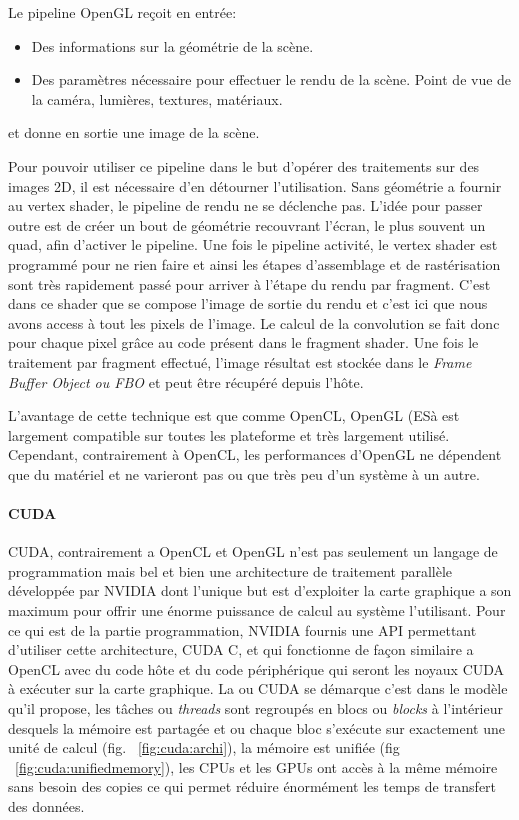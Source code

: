 
Le pipeline OpenGL reçoit en entrée:
\begin{itemize}
\item Des informations sur la géométrie de la scène.
\item Des paramètres nécessaire pour effectuer le rendu de la scène. Point de vue de la caméra, lumières, textures, matériaux.
\end{itemize}
et donne en sortie une image de la scène.

Pour pouvoir utiliser ce pipeline dans le but d'opérer des traitements sur des images 2D, il est nécessaire d'en détourner l'utilisation. Sans géométrie a fournir au vertex shader, le pipeline de rendu ne se déclenche pas. L'idée pour passer outre est de créer un bout de géométrie recouvrant l'écran, le plus souvent un quad, afin d'activer le pipeline. Une fois le pipeline activité, le vertex shader est programmé pour ne rien faire  et ainsi les étapes d'assemblage et de rastérisation sont très rapidement passé pour arriver à l'étape du rendu par fragment. C'est dans ce shader que se compose l'image de sortie du rendu et c'est ici que nous avons access à tout les pixels de l'image. Le calcul de la convolution se fait donc pour chaque pixel grâce au code présent dans le fragment shader. Une fois le traitement par fragment effectué, l'image résultat est stockée dans le \emph{Frame Buffer Object ou FBO} et peut être récupéré depuis l'hôte.

L'avantage de cette technique est que comme OpenCL, OpenGL (ESà est largement compatible sur toutes les plateforme et très largement utilisé. Cependant, contrairement à OpenCL, les performances d'OpenGL ne dépendent que du matériel et ne varieront pas ou que très peu d'un système à un autre.

\paragraph{CUDA} CUDA, contrairement a OpenCL et OpenGL n'est pas seulement un langage de programmation mais bel et bien une architecture de traitement parallèle développée par NVIDIA dont l'unique but est d'exploiter la carte graphique a son maximum pour offrir une énorme puissance de calcul au système l'utilisant. Pour ce qui est de la partie programmation, NVIDIA fournis une API permettant d'utiliser cette architecture, CUDA C, et qui fonctionne de façon similaire a OpenCL avec du code hôte et du code périphérique qui seront les noyaux CUDA à exécuter sur la carte graphique. La ou CUDA se démarque c'est dans le modèle qu'il propose, les tâches ou \emph{threads} sont regroupés en blocs ou \emph{blocks} à l'intérieur desquels la mémoire est partagée et ou chaque bloc s'exécute sur exactement une unité de calcul (fig. ~\ref{fig:cuda:archi}), la mémoire est unifiée (fig ~\ref{fig:cuda:unifiedmemory}), les CPUs et les GPUs ont accès à la même mémoire sans besoin des copies ce qui permet réduire énormément les temps de transfert des données.

